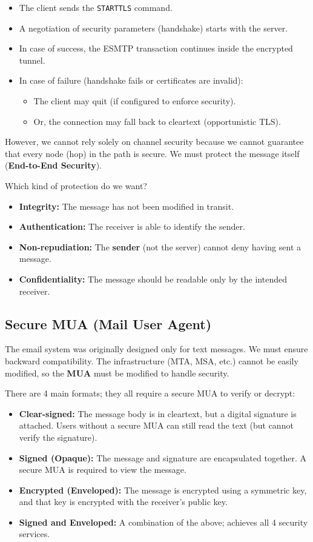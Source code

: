 \begin{itemize}
    \item The client sends the \texttt{STARTTLS} command.
    \item A negotiation of security parameters (handshake) starts with the server.
    \item In case of success, the ESMTP transaction continues inside the encrypted tunnel.
    \item In case of failure (handshake fails or certificates are invalid):
    \begin{itemize}
        \item The client may quit (if configured to enforce security).
        \item Or, the connection may fall back to cleartext (opportunistic TLS).
    \end{itemize}
\end{itemize}

However, we cannot rely solely on channel security because we cannot guarantee that every node (hop) in the path is secure. We must protect the message itself (\textbf{End-to-End Security}).

Which kind of protection do we want?
\begin{itemize}
    \item \textbf{Integrity:} The message has not been modified in transit.
    \item \textbf{Authentication:} The receiver is able to identify the sender.
    \item \textbf{Non-repudiation:} The \textbf{sender} (not the server) cannot deny having sent a message.
    \item \textbf{Confidentiality:} The message should be readable only by the intended receiver.
\end{itemize}

\subsection{Secure MUA (Mail User Agent)}
The email system was originally designed only for text messages. We must ensure backward compatibility. The infrastructure (MTA, MSA, etc.) cannot be easily modified, so the \textbf{MUA} must be modified to handle security.

There are 4 main formats; they all require a secure MUA to verify or decrypt:
\begin{itemize}
    \item \textbf{Clear-signed:} The message body is in cleartext, but a digital signature is attached. Users without a secure MUA can still read the text (but cannot verify the signature).
    \item \textbf{Signed (Opaque):} The message and signature are encapsulated together. A secure MUA is required to view the message.
    \item \textbf{Encrypted (Enveloped):} The message is encrypted using a symmetric key, and that key is encrypted with the receiver's public key.
    \item \textbf{Signed and Enveloped:} A combination of the above; achieves all 4 security services.
\end{itemize}



